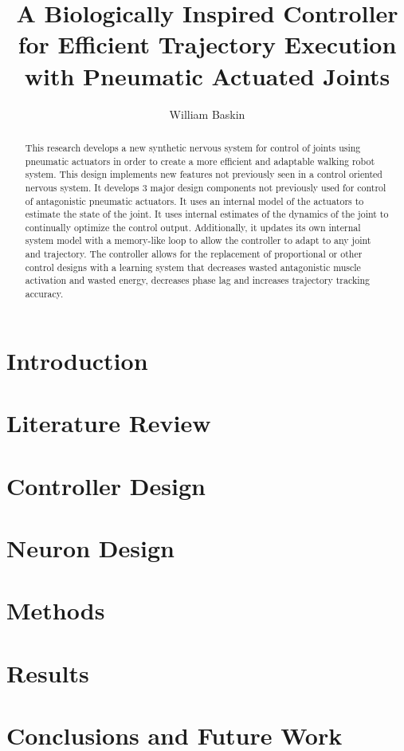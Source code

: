 \documentclass[letterpaper, 10 pt, conference]{IEEEconf} %
\author{William Baskin}
\title{
  {A Biologically Inspired Controller for Efficient Trajectory Execution with Pneumatic Actuated Joints}\\
}
\newcommand{\bbs}[1]{\section{#1}}
\begin{document}
\maketitle

\begin{abstract}
\label{chap:abstract}
This research develops a new synthetic nervous system for control of joints using pneumatic actuators in order to create a more efficient and adaptable walking robot system. This design implements new features not previously seen in a control oriented nervous system. It develops 3 major design components not previously used for control of antagonistic pneumatic actuators. It uses an internal model of the actuators to estimate the state of the joint. It uses internal estimates of the dynamics of the joint to continually optimize the control output. Additionally, it updates its own internal system model with a memory-like loop to allow the controller to adapt to any joint and trajectory. The controller allows for the replacement of proportional or other control designs with a learning system that decreases wasted antagonistic muscle activation and wasted energy, decreases phase lag and increases trajectory tracking accuracy.
\end{abstract}

\bbs{Introduction}
\label{chap:introduction}

\bbs{Literature Review}
\label{chap:lit_review}

\cite{einstein}

\bbs{Controller Design}
\label{chap:controller_design}

\bbs{Neuron Design}
\label{chap:neuron_design}

\bbs{Methods}
\label{chap:methods}

\bbs{Results}
\label{chap:results}

\bbs{Conclusions and Future Work}
\label{chap:conclusion}

\newpage
\label{chap:references}
\printbibliography[heading=bibintoc, title={Bibliography}]
\end{document}
